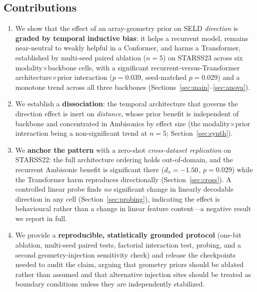 \subsection{Contributions}
\begin{enumerate}
  \item We show that the effect of an array-geometry prior on SELD \emph{direction}
  is \textbf{graded by temporal inductive bias}: it helps a recurrent model,
  remains near-neutral to weakly helpful in a Conformer, and harms a Transformer,
  established by multi-seed paired ablation ($n=5$) on STARSS23 across six
  modality$\times$backbone cells, with a significant recurrent-versus-Transformer
  architecture$\times$prior interaction ($p=0.039$, seed-matched $p=0.029$) and a
  monotone trend across all three backbones (Sections~\ref{sec:main}--\ref{sec:anova}).
  \item We establish a \textbf{dissociation}: the temporal architecture that
  governs the direction effect is inert on \emph{distance}, whose prior benefit is
  independent of backbone and concentrated in Ambisonics by effect size (the
  modality$\times$prior interaction being a non-significant trend at $n=5$;
  Section~\ref{sec:synth}).
  \item We \textbf{anchor the pattern} with a zero-shot \emph{cross-dataset
  replication} on STARSS22: the full architecture ordering holds out-of-domain,
  and the recurrent Ambisonic benefit is significant there ($d_z=-1.50$,
  $p=0.029$) while the Transformer harm reproduces directionally
  (Section~\ref{sec:cross}). A controlled linear probe finds \emph{no} significant
  change in linearly decodable direction in any cell (Section~\ref{sec:probing}),
  indicating the effect is behavioural rather than a change in linear feature
  content---a negative result we report in full.
  \item We provide a \textbf{reproducible, statistically grounded protocol}
  (one-bit ablation, multi-seed paired tests, factorial interaction test, probing,
  and a second geometry-injection sensitivity check) and release the checkpoints
  needed to audit the claim, arguing that geometry priors should be ablated rather
  than assumed and that alternative injection sites should be treated as boundary
  conditions unless they are independently stabilized.
\end{enumerate}
